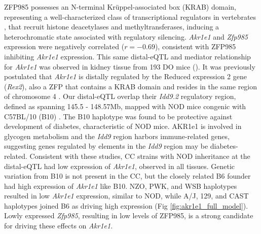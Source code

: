 \documentclass[10pt,letterpaper]{article}
\begin{document}
ZFP985 possesses an N-terminal Kr{\"u}ppel-associated box (KRAB) domain, representing a well-characterized class of transcriptional regulators in vertebrates \cite{Ecco2017}, that recruit histone deacetylases and methyltransferases, inducing a heterochromatic state associated with regulatory silencing. 
\textit{Akr1e1} and \textit{Zfp985} expression were negatively correlated ($r = -0.69$), consistent with ZFP985 inhibiting \textit{Akr1e1} expression. This same distal-eQTL and mediator relationship for \textit{Akr1e1} was observed in kidney tissue from 193 DO mice ().
It was previously postulated that \textit{Akr1e1} is distally regulated by the Reduced expression 2 gene (\textit{Rex2}), also a ZFP that contains a KRAB domain and resides in the same region of chromosome 4 \cite{HamiltonWilliams2013}.
Our distal-eQTL overlap their \textit{Idd9.2} regulatory region, defined as spanning 145.5 - 148.57Mb, mapped with NOD mice congenic with C57BL/10 (B10) \cite{HamiltonWilliams2010}.
The B10 haplotype was found to be protective against development of diabetes, characteristic of NOD mice.
AKR1e1 is involved in glycogen metabolism and the \textit{Idd9} region harbors immune-related genes, suggesting genes regulated by elements in the \textit{Idd9} region may be diabetes-related. 
Consistent with these studies, CC strains with NOD inheritance at the distal-eQTL had low expression of \textit{Akr1e1}, observed in all tissues.
Genetic variation from B10 is not present in the CC, but the closely related B6 founder had high expression of \textit{Akr1e1} like B10.
NZO, PWK, and WSB haplotypes resulted in low \textit{Akr1e1} expression, similar to NOD, while A/J, 129, and CAST haplotypes joined B6 as driving high expression (Fig \ref{fig:akr1e1_full_model}). Lowly expressed \textit{Zfp985}, resulting in low levels of ZFP985, is a strong candidate for driving these effects on \textit{Akr1e1}.
\end{document}
